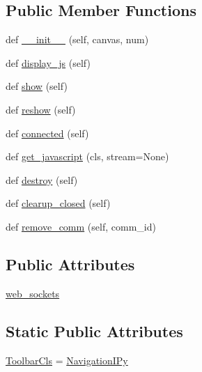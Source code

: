\subsection*{Public Member Functions}
\begin{DoxyCompactItemize}
\item 
def \hyperlink{classmatplotlib_1_1backends_1_1backend__nbagg_1_1FigureManagerNbAgg_a5d8b64341735b0f97d9da33c8cba98fa}{\+\_\+\+\_\+init\+\_\+\+\_\+} (self, canvas, num)
\item 
def \hyperlink{classmatplotlib_1_1backends_1_1backend__nbagg_1_1FigureManagerNbAgg_a940836cdf247cd1cc8678ac92aade95a}{display\+\_\+js} (self)
\item 
def \hyperlink{classmatplotlib_1_1backends_1_1backend__nbagg_1_1FigureManagerNbAgg_ae08595377bc6cf554f6f6ff4cbb54ec3}{show} (self)
\item 
def \hyperlink{classmatplotlib_1_1backends_1_1backend__nbagg_1_1FigureManagerNbAgg_ab6d7cd794677d20352a3eb4f4e699ccc}{reshow} (self)
\item 
def \hyperlink{classmatplotlib_1_1backends_1_1backend__nbagg_1_1FigureManagerNbAgg_ad5edcf748eab7c8dd121192863dba343}{connected} (self)
\item 
def \hyperlink{classmatplotlib_1_1backends_1_1backend__nbagg_1_1FigureManagerNbAgg_a42f3e01589b21e4887ada7c603f10051}{get\+\_\+javascript} (cls, stream=None)
\item 
def \hyperlink{classmatplotlib_1_1backends_1_1backend__nbagg_1_1FigureManagerNbAgg_abac472bc1d44882eb308929e30c938b9}{destroy} (self)
\item 
def \hyperlink{classmatplotlib_1_1backends_1_1backend__nbagg_1_1FigureManagerNbAgg_a95d8b4ff4ea219a72b0bcb3b8d10d74f}{clearup\+\_\+closed} (self)
\item 
def \hyperlink{classmatplotlib_1_1backends_1_1backend__nbagg_1_1FigureManagerNbAgg_ab00ae5d343dff7373c0b8a8d8395528a}{remove\+\_\+comm} (self, comm\+\_\+id)
\end{DoxyCompactItemize}
\subsection*{Public Attributes}
\begin{DoxyCompactItemize}
\item 
\hyperlink{classmatplotlib_1_1backends_1_1backend__nbagg_1_1FigureManagerNbAgg_a4c7884c5bd3a19d092a7931c55a4febf}{web\+\_\+sockets}
\end{DoxyCompactItemize}
\subsection*{Static Public Attributes}
\begin{DoxyCompactItemize}
\item 
\hyperlink{classmatplotlib_1_1backends_1_1backend__nbagg_1_1FigureManagerNbAgg_ad66f12a70d39ddc5c0c0cc93fdbc98ec}{Toolbar\+Cls} = \hyperlink{classmatplotlib_1_1backends_1_1backend__nbagg_1_1NavigationIPy}{Navigation\+I\+Py}
\end{DoxyCompactItemize}


